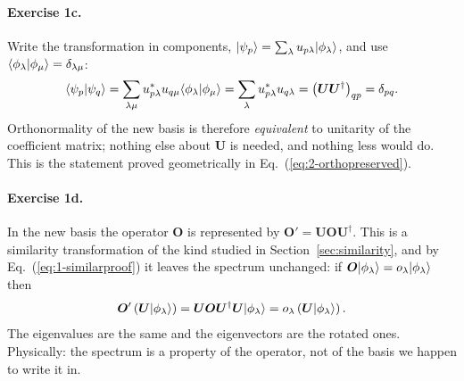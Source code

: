 \paragraph{Exercise 1c.}
Write the transformation in components,
$\vert \psi_p \rangle=\sum_{\lambda}u_{p\lambda}\vert \phi_{\lambda} \rangle$, and use
$\langle \phi_{\lambda} \vert \phi_{\mu} \rangle=\delta_{\lambda\mu}$:
\begin{equation}
  \langle \psi_p \vert \psi_q \rangle
   = \sum_{\lambda\mu}u_{p\lambda}^{*}u_{q\mu}
     \langle \phi_{\lambda} \vert \phi_{\mu} \rangle
   = \sum_{\lambda}u_{p\lambda}^{*}u_{q\lambda}
   = \left(\bm{U}\bm{U}^{\dagger}\right)_{qp}
   = \delta_{pq} .
  \label{eq:1-w34c}
\end{equation}
Orthonormality of the new basis is therefore \emph{equivalent} to unitarity of
the coefficient matrix; nothing else about $\bm{U}$ is needed, and nothing
less would do.  This is the statement proved geometrically in
Eq.~(\ref{eq:2-orthopreserved}).

\paragraph{Exercise 1d.}
In the new basis the operator $\bm{O}$ is represented by
$\bm{O}'=\bm{U}\bm{O}\bm{U}^{\dagger}$.  This is a similarity transformation
of the kind studied in Section~\ref{sec:similarity}, and by
Eq.~(\ref{eq:1-similarproof}) it leaves the spectrum unchanged: if
$\bm{O}\vert \phi_{\lambda} \rangle=o_{\lambda}\vert \phi_{\lambda} \rangle$ then
\begin{equation}
  \bm{O}'\left(\bm{U}\vert \phi_{\lambda} \rangle\right)
   = \bm{U}\bm{O}\bm{U}^{\dagger}\bm{U}\vert \phi_{\lambda} \rangle
   = o_{\lambda}\left(\bm{U}\vert \phi_{\lambda} \rangle\right) .
  \label{eq:1-w34d}
\end{equation}
The eigenvalues are the same and the eigenvectors are the rotated ones.
Physically: the spectrum is a property of the operator, not of the basis we
happen to write it in.

